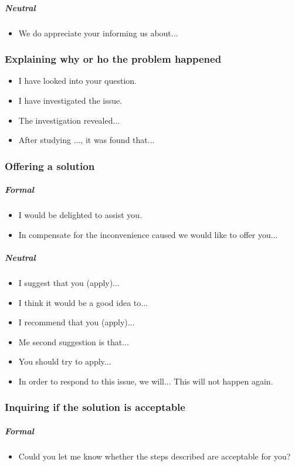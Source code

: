 \subparagraph{Neutral}
\begin{itemize}
\item We do appreciate your informing us about...
\end{itemize}

\subsubsection{Explaining why or ho the problem happened}
\begin{itemize}
\item I have looked into your question.
\item I have investigated the issue.
\item The investigation revealed...
\item After studying ..., it was found that...
\end{itemize}

\subsubsection{Offering a solution}
\subparagraph{Formal}
\begin{itemize}
\item I would be delighted to assist you.
\item In compensate for the inconvenience caused we would like to offer you...
\end{itemize}

\subparagraph{Neutral}
\begin{itemize}
\item I suggest that you (apply)...
\item I think it would be a good idea to...
\item I recommend that you (apply)...
\item Me second suggestion is that...
\item You should try to apply...
\item In order to respond to this issue, we will... This will not happen again.
\end{itemize}

\subsubsection{Inquiring if the solution is acceptable}
\subparagraph{Formal}
\begin{itemize}
\item Could you let me know whether the steps described are acceptable for you?
\end{itemize}

